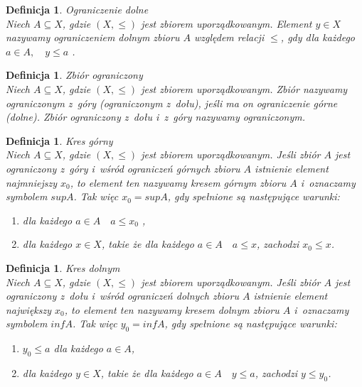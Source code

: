 \documentclass[12pt,a4paper]{report}
\newtheorem{definition}[theorem]{Definicja}
\begin{document}
\begin{definition}{Ograniczenie dolne \cite[Rozdział 2]{blaszczyk2007}}\\
Niech $A \subseteq X$, gdzie $(X, \leq)$ jest zbiorem uporządkowanym. Element $y \in X$ nazywamy ograniczeniem dolnym zbioru $A$ względem relacji $\leq$, gdy dla każdego $a \in A, \quad y \leq a$ . 
\end{definition}


\begin{definition}{Zbiór ograniczony \cite[Rozdział 2]{blaszczyk2007}}\\
Niech $A \subseteq X$, gdzie $(X, \leq)$ jest zbiorem uporządkowanym. Zbiór nazywamy ograniczonym z~góry (ograniczonym z~dołu), jeśli ma on ograniczenie górne (dolne). Zbiór ograniczony z~dołu i~z~góry nazywamy ograniczonym. 
\end{definition}


\begin{definition}{Kres górny \cite[Rozdział 2]{blaszczyk2007}}\\
Niech $A \subseteq X$, gdzie $(X, \leq)$ jest zbiorem uporządkowanym. Jeśli zbiór $A$ jest ograniczony z~góry i~wśród ograniczeń górnych zbioru $A$ istnienie element najmniejszy $x_0$, to element ten nazywamy kresem górnym zbioru $A$ i~oznaczamy symbolem $sup A$. Tak więc $x_0 =sup A$, gdy spełnione są następujące warunki:
\begin{enumerate}
\item dla każdego $a \in A \quad a \leq x_0$ ,
\item dla każdego $x \in X$, takie że dla każdego $a \in A \quad a \leq x$, zachodzi $x_0 \leq x$.
\end{enumerate}
\end{definition}


\begin{definition}{Kres dolnym \cite[Rozdział 2]{blaszczyk2007}}\\
Niech $A \subseteq X$, gdzie $(X, \leq)$ jest zbiorem uporządkowanym. Jeśli zbiór $A$ jest ograniczony z~dołu i~wśród ograniczeń dolnych zbioru $A$ istnienie element największy $x_0$, to element ten nazywamy kresem dolnym zbioru $A$ i~oznaczamy symbolem $inf A$. Tak więc $y_0 =inf A$, gdy spełnione są następujące warunki:
\begin{enumerate}
\item $y_0 \leq a$ dla każdego $a \in A$,
\item dla każdego $y \in X$, takie że dla każdego $a \in A \quad y \leq a$, zachodzi $y \leq y_0$.
\end{enumerate}
\end{definition}
\end{document}
